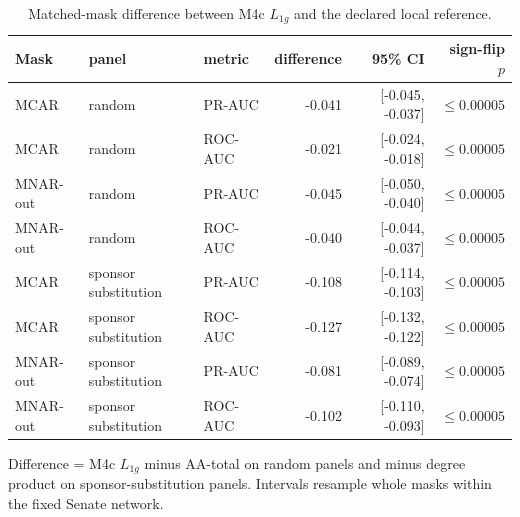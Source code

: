 \begin{table}[tbp]
\centering
\small
\caption{Matched-mask difference between M4c $L_{1g}$ and the declared local reference.}
\label{tab:senate-contrasts}
\begin{tabular}{lllrrr}
\toprule
Mask & panel & metric & difference & 95\% CI & sign-flip $p$ \\
\midrule
MCAR & random & PR-AUC & -0.041 & [-0.045, -0.037] & $\leq0.00005$ \\
MCAR & random & ROC-AUC & -0.021 & [-0.024, -0.018] & $\leq0.00005$ \\
MNAR-out & random & PR-AUC & -0.045 & [-0.050, -0.040] & $\leq0.00005$ \\
MNAR-out & random & ROC-AUC & -0.040 & [-0.044, -0.037] & $\leq0.00005$ \\
MCAR & sponsor substitution & PR-AUC & -0.108 & [-0.114, -0.103] & $\leq0.00005$ \\
MCAR & sponsor substitution & ROC-AUC & -0.127 & [-0.132, -0.122] & $\leq0.00005$ \\
MNAR-out & sponsor substitution & PR-AUC & -0.081 & [-0.089, -0.074] & $\leq0.00005$ \\
MNAR-out & sponsor substitution & ROC-AUC & -0.102 & [-0.110, -0.093] & $\leq0.00005$ \\
\bottomrule
\end{tabular}
\par\vspace{2pt}\footnotesize Difference = M4c $L_{1g}$ minus AA-total on random panels and minus degree product on sponsor-substitution panels. Intervals resample whole masks within the fixed Senate network.
\end{table}
